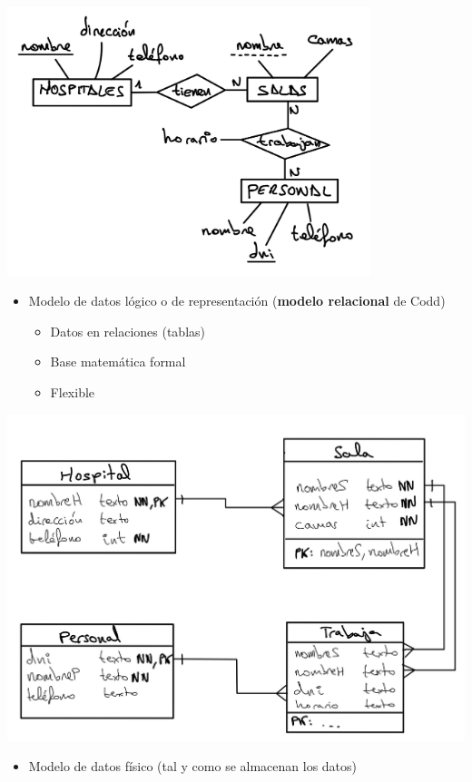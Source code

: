 \documentclass[
]{book}
\providecommand{\tightlist}{%
  \setlength{\itemsep}{0pt}\setlength{\parskip}{0pt}}
\begin{document}
\includegraphics[width=4.16667in,height=\textheight,keepaspectratio]{images/modelo-ER.png}

\begin{itemize}
\tightlist
\item
  Modelo de datos lógico o de representación (\textbf{modelo relacional} de Codd)

  \begin{itemize}
  \tightlist
  \item
    Datos en relaciones (tablas)
  \item
    Base matemática formal
  \item
    Flexible
  \end{itemize}
\end{itemize}

\includegraphics[width=6.25in,height=\textheight,keepaspectratio]{images/modelo-relacional.png}

\begin{itemize}
\tightlist
\item
  Modelo de datos físico (tal y como se almacenan los datos)
\end{itemize}
\end{document}
